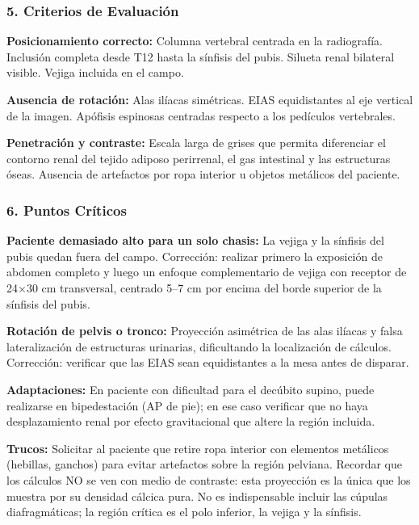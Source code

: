 	\subsubsection*{5. Criterios de Evaluación}
	
	\textbf{Posicionamiento correcto:} Columna vertebral centrada en la radiografía. Inclusión completa desde T12 hasta la sínfisis del pubis. Silueta renal bilateral visible. Vejiga incluida en el campo.
	
	\textbf{Ausencia de rotación:} Alas ilíacas simétricas. EIAS equidistantes al eje vertical de la imagen. Apófisis espinosas centradas respecto a los pedículos vertebrales.
	
	\textbf{Penetración y contraste:} Escala larga de grises que permita diferenciar el contorno renal del tejido adiposo perirrenal, el gas intestinal y las estructuras óseas. Ausencia de artefactos por ropa interior u objetos metálicos del paciente.
	
	\subsubsection*{6. Puntos Críticos}
	
	\textbf{Paciente demasiado alto para un solo chasis:} La vejiga y la sínfisis del pubis quedan fuera del campo. Corrección: realizar primero la exposición de abdomen completo y luego un enfoque complementario de vejiga con receptor de 24$\times$30 cm transversal, centrado 5--7 cm por encima del borde superior de la sínfisis del pubis.
	
	\textbf{Rotación de pelvis o tronco:} Proyección asimétrica de las alas ilíacas y falsa lateralización de estructuras urinarias, dificultando la localización de cálculos. Corrección: verificar que las EIAS sean equidistantes a la mesa antes de disparar.
	
	\textbf{Adaptaciones:} En paciente con dificultad para el decúbito supino, puede realizarse en bipedestación (AP de pie); en ese caso verificar que no haya desplazamiento renal por efecto gravitacional que altere la región incluida.
	
	\textbf{Trucos:} Solicitar al paciente que retire ropa interior con elementos metálicos (hebillas, ganchos) para evitar artefactos sobre la región pelviana. Recordar que los cálculos NO se ven con medio de contraste: esta proyección es la única que los muestra por su densidad cálcica pura. No es indispensable incluir las cúpulas diafragmáticas; la región crítica es el polo inferior, la vejiga y la sínfisis.
	
